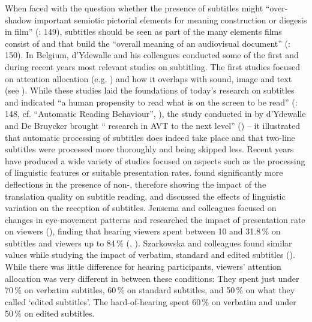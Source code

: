 When faced with the question whether the presence of subtitles might “over-shadow important semiotic pictorial elements for meaning construction or diegesis in film” (\citealt{Lautenbacher2012}: 149), subtitles should be seen as part of the many elements films consist of and that build the “overall meaning of an audiovisual document” (\citealt{Lautenbacher2012}: 150). In Belgium, d’Ydewalle and his colleagues conducted some of the first and during recent years most relevant  studies on subtitling. The first studies focused on attention allocation (e.g.  \citealt{Dydewalle1985}) and how it overlaps with sound, image and text (see \citealt{Dydewalle1992}). While these studies laid the foundations of today’s  research on subtitles and indicated “a human propensity to read what is on the screen to be read” (\citealt{Lautenbacher2012}: 148, cf. “Automatic Reading Behaviour”, \citealt{Dydewalle1991}), the study conducted in \citeyear{Dydewalle2007} by d’Ydewalle and De Bruycker brought “ research in AVT to the next level” (\citealt{Kruger????}) – it illustrated that automatic processing of subtitles does indeed take place and that two-line subtitles were processed more thoroughly and being skipped less. Recent years have produced a wide variety of studies focused on aspects such as the processing of linguistic features or suitable presentation rates. \citet{Ghia2012} found significantly more deflections in the presence of non-, therefore showing the impact of the translation quality on subtitle reading, and \citet{moran2008} discussed the effects of linguistic variation on the reception of subtitles. Jensema and colleagues focused on changes in eye-movement patterns and researched the impact of presentation rate on  viewers (\citeyear{Jensema-Danturthi2000}), finding that hearing viewers spent between 10 and 31.8\,\% on subtitles and  viewers up to 84\,\% (\citeyear{Jensema-ElSharkawy2000}, \citeyear{Jensema-Danturthi2000}). Szarkowska and colleagues found similar values while studying the impact of verbatim, standard and edited subtitles (\citeyear{szarkowska2011}). While there was little difference for hearing participants,  viewers’ attention allocation was very different in between these conditions: They spent just under 70\,\% on verbatim subtitles, 60\,\% on standard subtitles, and 50\,\% on what they called ‘edited subtitles’. The hard-of-hearing spent 60\,\% on verbatim and under 50\,\% on edited subtitles.

